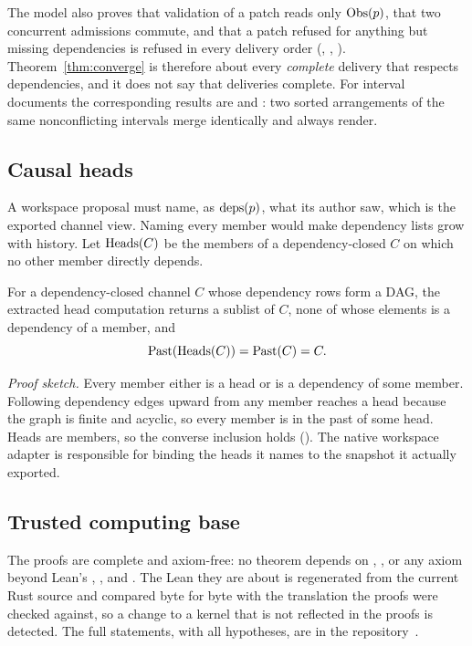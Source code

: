 The model also proves that validation of a patch reads only $\operatorname{Obs}(p)$, that two concurrent admissions commute, and that a patch refused for anything but missing dependencies is refused in every delivery order (, , ). Theorem~\ref{thm:converge} is therefore about every \emph{complete} delivery that respects dependencies, and it does not say that deliveries complete. For interval documents the corresponding results are  and : two sorted arrangements of the same nonconflicting intervals merge identically and always render.

\subsection{Causal heads}\label{sec:heads}
A workspace proposal must name, as $\operatorname{deps}(p)$, what its author saw, which is the exported channel view. Naming every member would make dependency lists grow with history. Let $\operatorname{Heads}(C)$ be the members of a dependency-closed $C$ on which no other member directly depends.
\begin{claim}\label{thm:heads}
For a dependency-closed channel $C$ whose dependency rows form a DAG, the extracted head computation returns a sublist of $C$, none of whose elements is a dependency of a member, and
\begin{equation}
 \operatorname{Past}(\operatorname{Heads}(C))=\operatorname{Past}(C)=C.
 \label{eq:heads}
\end{equation}
\end{claim}
\noindent\emph{Proof sketch.} Every member either is a head or is a dependency of some member. Following dependency edges upward from any member reaches a head because the graph is finite and acyclic, so every member is in the past of some head. Heads are members, so the converse inclusion holds (). The native workspace adapter is responsible for binding the heads it names to the snapshot it actually exported.

\subsection{Trusted computing base}\label{sec:gate}
The proofs are complete and axiom-free: no theorem depends on , , or any axiom beyond Lean's , , and . The Lean they are about is regenerated from the current Rust source and compared byte for byte with the translation the proofs were checked against, so a change to a kernel that is not reflected in the proofs is detected. The full statements, with all hypotheses, are in the repository~\cite{o1s}.

